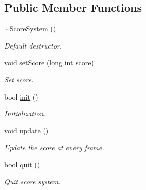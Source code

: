 \subsection*{Public Member Functions}
\begin{DoxyCompactItemize}
\item 
\mbox{\label{class_score_system_ab55183eed7762c7f785916f9122aa040}} 
\mbox{\hyperlink{class_score_system_ab55183eed7762c7f785916f9122aa040}{$\sim$\+Score\+System}} ()
\begin{DoxyCompactList}\small\item\em Default destructor. \end{DoxyCompactList}\item 
\mbox{\label{class_score_system_aa6d175f0e39e668e89964cbfe9906150}} 
void \mbox{\hyperlink{class_score_system_aa6d175f0e39e668e89964cbfe9906150}{set\+Score}} (long int \mbox{\hyperlink{class_score_system_a0d24909986b86503fa9cc48550eaeb5e}{score}})
\begin{DoxyCompactList}\small\item\em Set score. \end{DoxyCompactList}\item 
\mbox{\label{class_score_system_a0c40126adc6cd545d1742afef5f1bbd4}} 
bool \mbox{\hyperlink{class_score_system_a0c40126adc6cd545d1742afef5f1bbd4}{init}} ()
\begin{DoxyCompactList}\small\item\em Initialization. \end{DoxyCompactList}\item 
\mbox{\label{class_score_system_a9cab67f6abb9c7f04f0807e3c84cc04b}} 
void \mbox{\hyperlink{class_score_system_a9cab67f6abb9c7f04f0807e3c84cc04b}{update}} ()
\begin{DoxyCompactList}\small\item\em Update the score at every frame. \end{DoxyCompactList}\item 
\mbox{\label{class_score_system_a22a5a1a6f51424268c0c3a2edb91b008}} 
bool \mbox{\hyperlink{class_score_system_a22a5a1a6f51424268c0c3a2edb91b008}{quit}} ()
\begin{DoxyCompactList}\small\item\em Quit score system. \end{DoxyCompactList}\item 

\end{DoxyCompactItemize}
